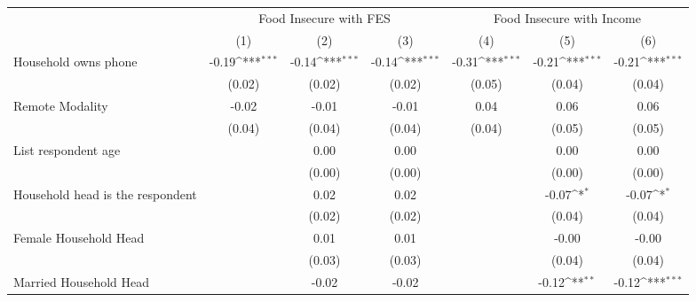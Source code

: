 {
\def\sym#1{\ifmmode^{#1}\else\(^{#1}\)\fi}
\begin{tabular}{l*{6}{c}}
\hline\hline
                    &\multicolumn{3}{c}{Food Insecure with FES}                       &\multicolumn{3}{c}{Food Insecure with Income}                    \\\cmidrule(lr){2-4}\cmidrule(lr){5-7}
                    &\multicolumn{1}{c}{(1)}         &\multicolumn{1}{c}{(2)}         &\multicolumn{1}{c}{(3)}         &\multicolumn{1}{c}{(4)}         &\multicolumn{1}{c}{(5)}         &\multicolumn{1}{c}{(6)}         \\
\hline
Household owns phone&       -0.19\sym{***}&       -0.14\sym{***}&       -0.14\sym{***}&       -0.31\sym{***}&       -0.21\sym{***}&       -0.21\sym{***}\\
                    &      (0.02)         &      (0.02)         &      (0.02)         &      (0.05)         &      (0.04)         &      (0.04)         \\
Remote Modality     &       -0.02         &       -0.01         &       -0.01         &        0.04         &        0.06         &        0.06         \\
                    &      (0.04)         &      (0.04)         &      (0.04)         &      (0.04)         &      (0.05)         &      (0.05)         \\
List respondent age &                     &        0.00         &        0.00         &                     &        0.00         &        0.00         \\
                    &                     &      (0.00)         &      (0.00)         &                     &      (0.00)         &      (0.00)         \\
Household head is the respondent&                     &        0.02         &        0.02         &                     &       -0.07\sym{*}  &       -0.07\sym{*}  \\
                    &                     &      (0.02)         &      (0.02)         &                     &      (0.04)         &      (0.04)         \\
Female Household Head&                     &        0.01         &        0.01         &                     &       -0.00         &       -0.00         \\
                    &                     &      (0.03)         &      (0.03)         &                     &      (0.04)         &      (0.04)         \\
Married Household Head&                     &       -0.02         &       -0.02         &                     &       -0.12\sym{**} &       -0.12\sym{***}\\

\end{tabular}}
